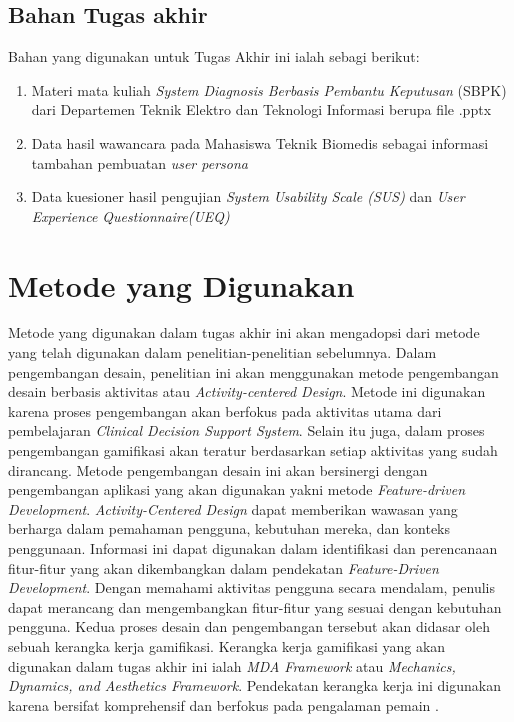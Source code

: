 \subsection{Bahan Tugas akhir}
Bahan yang digunakan untuk Tugas Akhir ini ialah sebagi berikut:
\begin{enumerate}
	\item Materi mata kuliah \textit{System Diagnosis Berbasis Pembantu Keputusan} (SBPK) dari Departemen Teknik Elektro dan Teknologi Informasi berupa file .pptx
	\item Data hasil wawancara pada Mahasiswa Teknik Biomedis sebagai informasi tambahan pembuatan \textit{user persona}
	\item Data kuesioner hasil pengujian \textit{System Usability Scale (SUS)} dan \textit{User Experience Questionnaire(UEQ)}
\end{enumerate}

\section{Metode yang Digunakan}
Metode yang digunakan dalam tugas akhir ini akan mengadopsi dari metode yang telah digunakan dalam penelitian-penelitian sebelumnya.
Dalam pengembangan desain, penelitian ini akan menggunakan metode pengembangan desain berbasis aktivitas atau \textit{Activity-centered Design}.
Metode ini digunakan karena proses pengembangan akan berfokus pada aktivitas utama dari pembelajaran \textit{Clinical Decision Support System}.
Selain itu juga, dalam proses pengembangan gamifikasi akan teratur berdasarkan setiap aktivitas yang sudah dirancang.
Metode pengembangan desain ini akan bersinergi dengan pengembangan aplikasi yang akan digunakan yakni metode \textit{Feature-driven Development}.
\textit{Activity-Centered Design} dapat memberikan wawasan yang berharga dalam pemahaman pengguna, kebutuhan mereka, dan konteks penggunaan. 
Informasi ini dapat digunakan dalam identifikasi dan perencanaan fitur-fitur yang akan dikembangkan dalam pendekatan \textit{Feature-Driven Development}. 
Dengan memahami aktivitas pengguna secara mendalam, penulis dapat merancang dan mengembangkan fitur-fitur yang sesuai dengan kebutuhan pengguna.
Kedua proses desain dan pengembangan tersebut akan didasar oleh sebuah kerangka kerja gamifikasi. 
Kerangka kerja gamifikasi yang akan digunakan dalam tugas akhir ini ialah \textit{MDA Framework} atau \textit{Mechanics, Dynamics, and Aesthetics Framework}.
Pendekatan kerangka kerja ini digunakan karena bersifat komprehensif dan berfokus pada pengalaman pemain \cite{marisa2020gamifikasi}.

